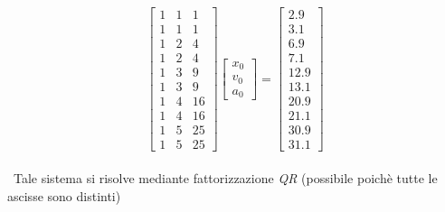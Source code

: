 	\[
		\begin{bmatrix}
			1 & 1 & 1 \\
			1 & 1 & 1 \\
			1 & 2 & 4 \\
			1 & 2 & 4 \\
			1 & 3 & 9 \\
			1 & 3 & 9 \\
			1 & 4 & 16 \\
			1 & 4 & 16 \\
			1 & 5 & 25 \\
			1 & 5 & 25 				
		\end{bmatrix}
		\begin{bmatrix}
			x_0 \\
			v_0 \\
			a_0
		\end{bmatrix}=
		\begin{bmatrix}
			2.9 \\
			3.1 \\
			6.9 \\
			7.1 \\
			12.9 \\
			13.1 \\
			20.9 \\
			21.1 \\
			30.9 \\
			31.1
		\end{bmatrix}
	\]\\\
Tale sistema si risolve mediante fattorizzazione \textit{QR} (possibile poichè tutte le ascisse sono distinti)